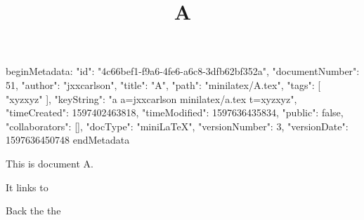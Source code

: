 beginMetadata:
{
    "id": "4c66bef1-f9a6-4fe6-a6c8-3dfb62bf352a",
    "documentNumber": 51,
    "author": "jxxcarlson",
    "title": "A",
    "path": "minilatex/A.tex",
    "tags": [
        "xyzxyz"
    ],
    "keyString": "a a=jxxcarlson minilatex/a.tex t=xyzxyz",
    "timeCreated": 1597402463818,
    "timeModified": 1597636435834,
    "public": false,
    "collaborators": [],
    "docType": "miniLaTeX",
    "versionNumber": 3,
    "versionDate": 1597636450748
}
endMetadata
\title{A}

\maketitle

This is document A.

It links to 

Back the the 

